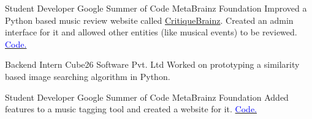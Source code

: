     {Student Developer}
    {Google Summer of Code}
    {MetaBrainz Foundation}
    {}
    {
        Improved a Python based music review website called \href{http://critiquebrainz.org/}{CritiqueBrainz}.
        Created an admin interface for it
        and allowed other entities (like musical events) to be reviewed.
        \hfill
        \href{https://github.com/metabrainz/critiquebrainz/commits?author=dufferzafar}{\textcolor{blue}{\scriptsize Code.}}
    }
    \vspace*{0.2\baselineskip}

    {Backend Intern}
    {Cube26 Software Pvt. Ltd}
    {}
    {}
    {
        Worked on prototyping a similarity based image searching algorithm in Python.
    }
    \vspace*{0.2\baselineskip}

    {Student Developer}
    {Google Summer of Code}
    {MetaBrainz Foundation}
    {}
    {
        Added features to a music tagging tool and created a website for it.
        \hfill
        \href{https://github.com/metabrainz/picard-website/commits?author=dufferzafar}{\textcolor{blue}{\scriptsize Code.}}
    }
    \vspace*{0.2\baselineskip}
